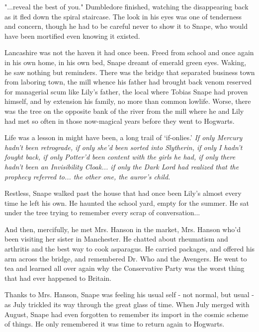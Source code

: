 "...reveal the best of you." Dumbledore finished, watching the disappearing back as it fled down the spiral staircase. The look in his eyes was one of tenderness and concern, though he had to be careful never to show it to Snape, who would have been mortified even knowing it existed.

Lancashire was not the haven it had once been. Freed from school and once again in his own home, in his own bed, Snape dreamt of emerald green eyes. Waking, he saw nothing but reminders. There was the bridge that separated business town from laboring town, the mill whence his father had brought back venom reserved for managerial scum like Lily's father, the local where Tobias Snape had proven himself, and by extension his family, no more than common lowlife. Worse, there was the tree on the opposite bank of the river from the mill where he and Lily had met so often in those now-magical years before they went to Hogwarts.

Life was a lesson in might have been, a long trail of `if-onlies.' \emph{If only Mercury hadn't been retrograde, if only she'd been sorted into Slytherin, if only I hadn't fought back, if only Potter'd been content with the girls he had, if only there hadn't been an Invisibility Cloak... if only the Dark Lord had realized that the prophecy referred to... the other one, the auror's child.}

Restless, Snape walked past the house that had once been Lily's almost every time he left his own. He haunted the school yard, empty for the summer. He sat under the tree trying to remember every scrap of conversation...

And then, mercifully, he met Mrs. Hanson in the market, Mrs. Hanson who'd been visiting her sister in Manchester. He chatted about rheumatism and arthritis and the best way to cook asparagus. He carried packages, and offered his arm across the bridge, and remembered Dr. Who and the Avengers. He went to tea and learned all over again why the Conservative Party was the worst thing that had ever happened to Britain.

Thanks to Mrs. Hanson, Snape was feeling his usual self - not normal, but usual - as July trickled its way through the great glass of time. When July merged with August, Snape had even forgotten to remember its import in the cosmic scheme of things. He only remembered it was time to return again to Hogwarts.


